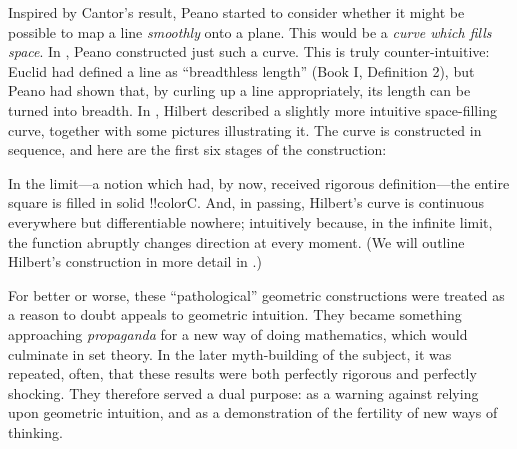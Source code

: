 \documentclass[../../../include/open-logic-section]{subfiles}
\begin{document}
Inspired by Cantor's result, Peano started to consider whether it
might be possible to map a line \emph{smoothly} onto a plane. This
would be a \emph{curve which fills space}. In \cite{Peano1890},
Peano constructed just such a curve. This is truly counter-intuitive:
Euclid had defined a line as ``breadthless length'' (Book I,
Definition 2), but Peano had shown that, by curling up a line
appropriately, its length can be turned into breadth. In
\cite{Hilbert1891}, Hilbert described a slightly more intuitive
space-filling curve, together with some pictures illustrating it. The
curve is constructed in sequence, and here are the first six stages of
the construction:
\begin{center}
\end{center}
In the limit---a notion which had, by now, received rigorous
definition---the entire square is filled in solid !!{colorC}. And, in
passing, Hilbert's curve is continuous everywhere but differentiable
nowhere; intuitively because, in the infinite limit, the function
abruptly changes direction at every moment. (We will outline Hilbert's
construction in more detail in .)

For better or worse, these ``pathological'' geometric constructions
were treated as a reason to doubt appeals to geometric intuition. They
became something approaching \emph{propaganda} for a new way of doing
mathematics, which would culminate in set theory. In the later
myth-building of the subject, it was repeated, often, that these
results were both perfectly rigorous and perfectly shocking. They
therefore served a dual purpose: as a warning against relying upon
geometric intuition, and as a demonstration of the fertility of new
ways of thinking. 
\end{document}
